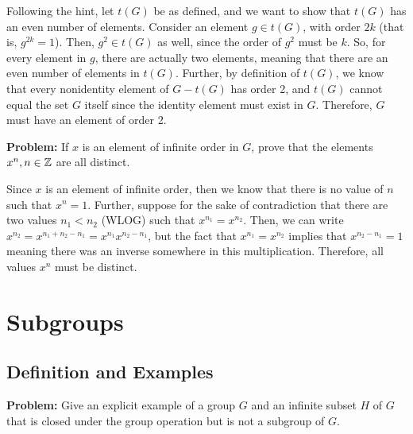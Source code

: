 \documentclass[10pt]{article}
\newenvironment{problem}{\textbf{Problem:}}{}
\begin{document}
	\begin{solution}
		Following the hint, let \( t(G) \) be as defined, and we want to show that \( t(G) \) has 
		an even number of elements. Consider an element \( g \in t(G) \), with order 
		\( 2k \) (that is, \( g^{2k} = 1 \)). Then, \( g^2 \in t(G) \) as well, since the order of 
		\( g^2  \) must be \( k \). So, for every element in \( g \), there are actually two elements, meaning 
		that there are an even number of elements in \( t(G) \). Further, by definition of \( t(G) \), 
		we know that every nonidentity element of \( G - t(G) \) has order 2, and \( t(G) \) cannot equal 
		the set \( G \) itself since the identity element must exist in \( G \). Therefore, \( G \) 
		must have an element of order 2. 

	\end{solution}

	\begin{problem}
		If \( x \) is an element of infinite order in \( G \), prove that the elements \( x^{n}, n \in \mathbb Z \) 
		are all distinct. 
	\end{problem}

	\begin{solution}
		Since \( x \) is an element of infinite order, then we know that there is no value of \( n \) such that 
		\( x^{n} = 1 \). Further, suppose for the sake of contradiction that there are two values \( n_1 < n_2 \) 
		(WLOG) such that \( x^{n_1} = x^{n_2} \). Then, we can write \( x^{n_2} = x^{n_1 + n_2 - n_1} = 
		x^{n_1} x^{n_2 - n_1}\), but the fact that \( x^{n_1} = x^{n_2} \) implies that \( x^{n_2 - n_1} = 1 \) 
		meaning there was an inverse somewhere in this multiplication. 
		Therefore, all values \( x^{n} \) must be distinct. 
	\end{solution}
	\section{Subgroups}
	\subsection{Definition and Examples}

	\begin{problem}
		Give an explicit example of a group \( G \) and an infinite subset \( H \) of \( G \) that is 
		closed under the group operation but is not a subgroup of \( G \). 
	\end{problem}
\end{document}
